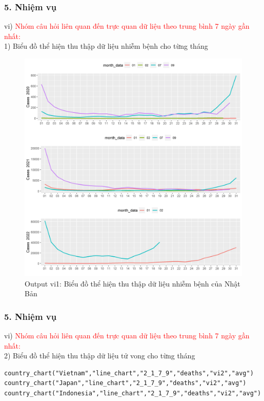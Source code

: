 \documentclass[english,10pt,table]{beamer}
\begin{document}
\begin{frame}[fragile]
\frametitle{5.  Nhiệm vụ}
vi) \textcolor{red}{Nhóm câu hỏi liên quan đến trực quan dữ liệu theo trung bình 7 ngày gần nhất:}\\
    1) Biểu đồ thể hiện thu thập dữ liệu nhiễm bệnh cho từng tháng
	\begin{figure}[h!]
	\begin{center}
		    \includegraphics[scale = 0.26]{Images/VI/vi1 Japan .jpeg}
		     \caption{Output vi1: Biểu đồ thể hiện thu thập dữ liệu nhiễm bệnh của Nhật Bản}
		\end{center}
		\end{figure}
\end{frame}

\begin{frame}[fragile]
\frametitle{5.  Nhiệm vụ}
vi) \textcolor{red}{Nhóm câu hỏi liên quan đến trực quan dữ liệu theo trung bình 7 ngày gần nhất:}\\
    2) Biểu đồ thể hiện thu thập dữ liệu tử vong cho từng tháng
    \begin{lstlisting}[frame=single,basicstyle=\tiny]  
country_chart("Vietnam","line_chart","2_1_7_9","deaths","vi2","avg")
country_chart("Japan","line_chart","2_1_7_9","deaths","vi2","avg")
country_chart("Indonesia","line_chart","2_1_7_9","deaths","vi2","avg")
		\end{lstlisting}
\end{frame}
\end{document}
